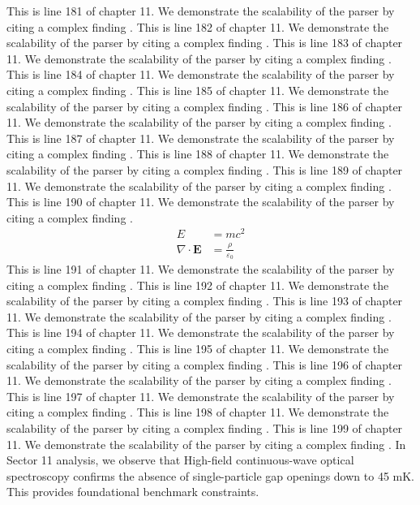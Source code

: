This is line 181 of chapter 11. We demonstrate the scalability of the parser by citing a complex finding \cite{ref11_181}.
This is line 182 of chapter 11. We demonstrate the scalability of the parser by citing a complex finding \cite{ref11_182}.
This is line 183 of chapter 11. We demonstrate the scalability of the parser by citing a complex finding \cite{ref11_183}.
This is line 184 of chapter 11. We demonstrate the scalability of the parser by citing a complex finding \cite{ref11_184}.
This is line 185 of chapter 11. We demonstrate the scalability of the parser by citing a complex finding \cite{ref11_185}.
This is line 186 of chapter 11. We demonstrate the scalability of the parser by citing a complex finding \cite{ref11_186}.
This is line 187 of chapter 11. We demonstrate the scalability of the parser by citing a complex finding \cite{ref11_187}.
This is line 188 of chapter 11. We demonstrate the scalability of the parser by citing a complex finding \cite{ref11_188}.
This is line 189 of chapter 11. We demonstrate the scalability of the parser by citing a complex finding \cite{ref11_189}.
This is line 190 of chapter 11. We demonstrate the scalability of the parser by citing a complex finding \cite{ref11_190}.
\begin{align*}
  E &= mc^2 \\
  \nabla \cdot \mathbf{E} &= \frac{\rho}{\varepsilon_0}
\end{align*}
This is line 191 of chapter 11. We demonstrate the scalability of the parser by citing a complex finding \cite{ref11_191}.
This is line 192 of chapter 11. We demonstrate the scalability of the parser by citing a complex finding \cite{ref11_192}.
This is line 193 of chapter 11. We demonstrate the scalability of the parser by citing a complex finding \cite{ref11_193}.
This is line 194 of chapter 11. We demonstrate the scalability of the parser by citing a complex finding \cite{ref11_194}.
This is line 195 of chapter 11. We demonstrate the scalability of the parser by citing a complex finding \cite{ref11_195}.
This is line 196 of chapter 11. We demonstrate the scalability of the parser by citing a complex finding \cite{ref11_196}.
This is line 197 of chapter 11. We demonstrate the scalability of the parser by citing a complex finding \cite{ref11_197}.
This is line 198 of chapter 11. We demonstrate the scalability of the parser by citing a complex finding \cite{ref11_198}.
This is line 199 of chapter 11. We demonstrate the scalability of the parser by citing a complex finding \cite{ref11_199}.
In Sector 11 analysis, we observe that High-field continuous-wave optical spectroscopy confirms the absence of single-particle gap openings down to 45 mK. This provides foundational benchmark constraints.
